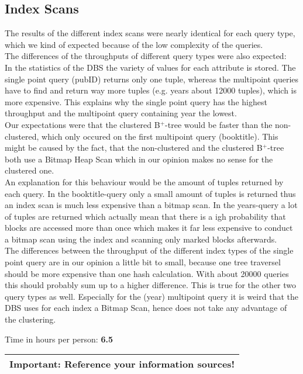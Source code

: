 \documentclass[11pt]{scrartcl}
\begin{document}
\subsection{Index Scans}
The results of the different index scans were nearly identical for each query type, which we kind of expected because of the low complexity of the queries.\\
The differences of the throughputs of different query types were also expected:\\
In the statistics of the DBS the variety of values for each attribute is stored. The single point query (pubID) returns only one tuple, whereas the multipoint queries have to find and return way more tuples (e.g. years about 12000 tuples), which is more expensive. This explains why the single point query has the highest throughput and the multipoint query containing year the lowest.\\
Our expectations were that the clustered B$^+$-tree would be faster than the non-clustered, which only occured on the first multipoint query (booktitle). This might be caused by the fact, that the non-clustered and the clustered B$^+$-tree both use a Bitmap Heap Scan which in our opinion makes no sense for the clustered one.\\
An explanation for this behaviour would be the amount of tuples returned by each query. In the booktitle-query only a small amount of tuples is returned thus an index scan is much less expensive than a bitmap scan. In the years-query a lot of tuples are returned which actually mean that there is a igh probability that blocks are accessed more than once which makes it far less expensive to conduct a bitmap scan using the index and scanning only marked blocks afterwards.\\ 
The differences between the throughput of the different index types of the single point query are in our opinion a little bit to small, because one tree traversel should be more expensive than one hash calculation. With about 20000 queries this should probably sum up to a higher difference. This is true for the other two query types as well. Especially for the (year) multipoint query it is weird that the DBS uses for each index a Bitmap Scan, hence does not take any advantage of the clustering.

\bigskip

\noindent Time in hours per person: {\bf 6.5}

\bigskip

\begin{center}
  \begin{tabular}{c}
    \hline
    {\bf Important:} Reference your information sources!
    \\\hline
  \end{tabular}
\end{center}
\end{document}

